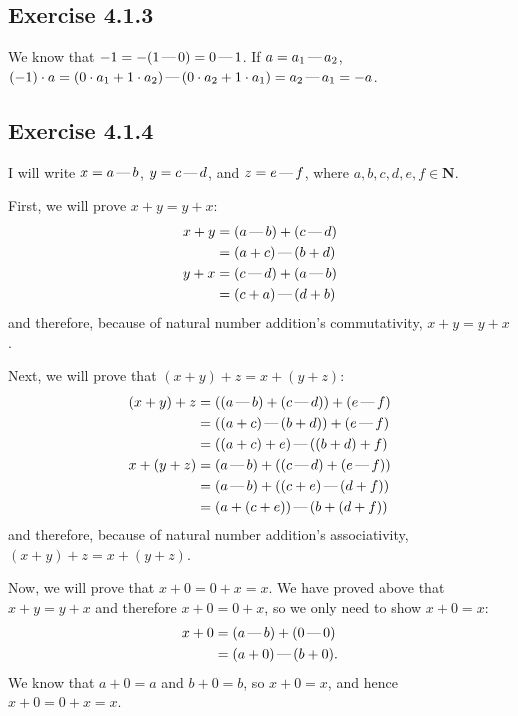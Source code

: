 \documentclass[12pt, oneside]{book}
\newcommand{\formalminus}{\, \text{\textemdash} \,}
\begin{document}
	\subsection*{Exercise 4.1.3}
	
	We know that $-1 = -(1 \formalminus 0) = 0 \formalminus 1$. If $a = a_1 \formalminus a_2$, $(-1) \cdot a = (0 \cdot a_1 + 1 \cdot a_2) \formalminus (0 \cdot a_2 + 1 \cdot a_1) = a_2 \formalminus a_1 = -a$.
	
	\subsection*{Exercise 4.1.4}
	
	I will write $x = a \formalminus b$, $y = c \formalminus d$, and $z = e \formalminus f$, where $a, b, c, d, e, f \in \mathbf{N}$.
	
	First, we will prove $x + y = y + x$:
	\begin{align*}
		x + y &= (a \formalminus b) + (c \formalminus d) \\
		&= (a + c) \formalminus (b + d) \\
		y + x &= (c \formalminus d) + (a \formalminus b) \\
		&= (c + a) \formalminus (d + b)
	\end{align*}
	and therefore, because of natural number addition's commutativity, $x + y = y + x$.
	
	Next, we will prove that $(x + y) + z = x + (y + z)$:
	\begin{align*}
		(x + y) + z &= ((a \formalminus b) + (c \formalminus d)) + (e \formalminus f) \\
		&= ((a + c) \formalminus (b + d)) + (e \formalminus f) \\
		&= ((a + c) + e) \formalminus ((b + d) + f) \\
		x + (y + z) &= (a \formalminus b) + ((c \formalminus d) + (e \formalminus f)) \\
		&= (a \formalminus b) + ((c + e) \formalminus (d + f)) \\
		&= (a + (c + e)) \formalminus (b + (d + f))
	\end{align*}
	and therefore, because of natural number addition's associativity, $(x + y) + z = x + (y + z)$.
	
	Now, we will prove that $x + 0 = 0 + x = x$. We have proved above that $x + y = y + x$ and therefore $x + 0 = 0 + x$, so we only need to show $x + 0 = x$:
	\[\begin{split}
		x + 0 &= (a \formalminus b) + (0 \formalminus 0) \\
		&= (a + 0) \formalminus (b + 0).
	\end{split}\]
	We know that $a + 0 = a$ and $b + 0 = b$, so $x + 0 = x$, and hence $x + 0 = 0 + x = x$.
	
\end{document}
